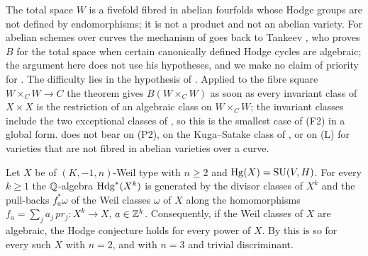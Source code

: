 \begin{remark}\label{rem:newlefschetzscope}
The total space $W$ is a fivefold fibred in abelian fourfolds whose Hodge
groups are not defined by endomorphisms; it is not a product and not an
abelian variety. For abelian schemes over curves the mechanism of
 goes back to Tankeev \cite{Tan03}, who proves $B$
for the total space when certain canonically defined Hodge cycles are
algebraic; the argument here does not use his hypotheses, and we make no
claim of priority for . The difficulty lies in the hypothesis of
.
Applied to the fibre square $W\times_{C}W\to C$ the theorem gives
$B(W\times_{C}W)$ as soon as every invariant class of $X\times X$ is the
restriction of an algebraic class on $W\times_{C}W$; the invariant classes
include the two exceptional classes of , so this
is the smallest case of (F2) in a global form.  does not bear on (P2), on the Kuga--Satake
class of , or on \textup{(L)} for varieties that are not
fibred in abelian varieties over a curve.
\end{remark}

\begin{proposition}\label{prop:powers}
Let $X$ be of $(K,-1,n)$-Weil type with $n\ge2$ and $\operatorname{Hg}(X)=\operatorname{SU}(V,H)$. For
every $k\ge1$ the $\mathbb{Q}$-algebra $\mathrm{Hdg}^{*}(X^{k})$ is generated by the divisor
classes of $X^{k}$ and the pull-backs $f_{a}^{*}\omega$ of the Weil classes
$\omega$ of $X$ along the homomorphisms $f_{a}=\sum_{j}a_{j}\,pr_{j}\colon
X^{k}\to X$, $a\in\mathbb{Z}^{k}$. Consequently, if the Weil classes of $X$ are
algebraic, the Hodge conjecture holds for every power of $X$. By
\cite{Mar25a} this is so for every such $X$ with $n=2$, and with $n=3$ and
trivial discriminant.
\end{proposition}

